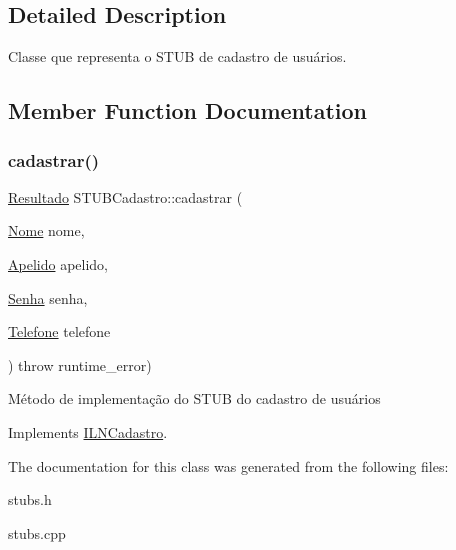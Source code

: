 \subsection{Detailed Description}
Classe que representa o S\+T\+UB de cadastro de usuários. 

\subsection{Member Function Documentation}
\mbox{\label{classSTUBCadastro_a030d1572eee2691495fc4401c052d99b}} 
\subsubsection{\texorpdfstring{cadastrar()}{cadastrar()}}
{\footnotesize\ttfamily \hyperlink{classResultado}{Resultado} S\+T\+U\+B\+Cadastro\+::cadastrar (\begin{DoxyParamCaption}\item[{\hyperlink{classNome}{Nome}}]{nome,  }\item[{\hyperlink{classApelido}{Apelido}}]{apelido,  }\item[{\hyperlink{classSenha}{Senha}}]{senha,  }\item[{\hyperlink{classTelefone}{Telefone}}]{telefone }\end{DoxyParamCaption}) throw  runtime\+\_\+error) \hspace{0.3cm}{\ttfamily [virtual]}}

Método de implementação do S\+T\+UB do cadastro de usuários 

Implements \hyperlink{classILNCadastro}{I\+L\+N\+Cadastro}.



The documentation for this class was generated from the following files\+:\begin{DoxyCompactItemize}
\item 
stubs.\+h\item 
stubs.\+cpp\end{DoxyCompactItemize}
